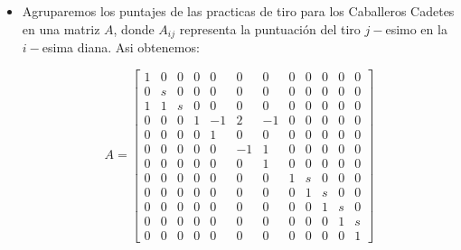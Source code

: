 \documentclass[12pt,a4paper]{article}
\begin{document}
\begin{itemize}
	
	\item Agruparemos los puntajes de las practicas de tiro para los Caballeros Cadetes en una matriz $A$, donde $A_{ij}$ representa la puntuación del tiro $j-$esimo en la $i-$esima diana. Asi obtenemos:
	
	\setcounter{MaxMatrixCols}{20}
	\begin{equation}\label{item1}
	A = \begin{bmatrix}
	1& 0& 0& 0&  0&  0&  0& 0& 0& 0& 0& 0\\
	0& s& 0& 0&  0&  0&  0& 0& 0& 0& 0& 0\\
	1& 1& s& 0&  0&  0&  0& 0& 0& 0& 0& 0\\
	0& 0& 0& 1& -1&  2& -1& 0& 0& 0& 0& 0\\
	0& 0& 0& 0&  1&  0&  0& 0& 0& 0& 0& 0\\
	0& 0& 0& 0&  0& -1&  1& 0& 0& 0& 0& 0\\
	0& 0& 0& 0&  0&  0&  1& 0& 0& 0& 0& 0\\
	0& 0& 0& 0&  0&  0&  0& 1& s& 0& 0& 0\\
	0& 0& 0& 0&  0&  0&  0& 0& 1& s& 0& 0\\
	0& 0& 0& 0&  0&  0&  0& 0& 0& 1& s& 0\\
	0& 0& 0& 0&  0&  0&  0& 0& 0& 0& 1& s\\
	0& 0& 0& 0&  0&  0&  0& 0& 0& 0& 0& 1
	\end{bmatrix}
	\end{equation}
	

\end{itemize}
\end{document}
